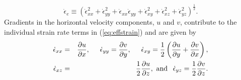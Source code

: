 \documentclass[review,oneside]{igs}
\begin{document}
\begin{equation} \label{eq:effstrain}
\dot{\epsilon}_e \equiv \left( \dot{\epsilon}_{xx}^2 +
\dot{\epsilon}_{yy}^2 + \dot{\epsilon}_{xx} \dot{\epsilon}_{yy} +
\dot{\epsilon}_{xy}^2 + \dot{\epsilon}_{xz}^2 +
\dot{\epsilon}_{yz}^2 \right)^\frac{1}{2}.
\end{equation}
Gradients in the horizontal velocity components, $u$ and $v$, contribute to the individual strain rate terms in (\ref{eq:effstrain}) and are given by
\begin{eqnarray} \label{eq:epsilonij}
\dot{\epsilon}_{xx} &=& \frac{\partial u}{\partial x}, \hspace{0.5cm} 
\dot{\epsilon}_{yy} = \frac{\partial v}{\partial y}, \hspace{0.5cm}
\dot{\epsilon}_{xy} = \frac{1}{2}\left(\frac{\partial u}{\partial y} + \frac{\partial v}{\partial x} \right), \nonumber\\ 
\dot{\epsilon}_{xz} &=& \frac{1}{2} \frac{\partial u}{\partial z}, \textrm{ and } \hspace{0.15cm} 
\dot{\epsilon}_{yz} = \frac{1}{2} \frac{\partial v}{\partial z}.
\end{eqnarray}
\end{document}
